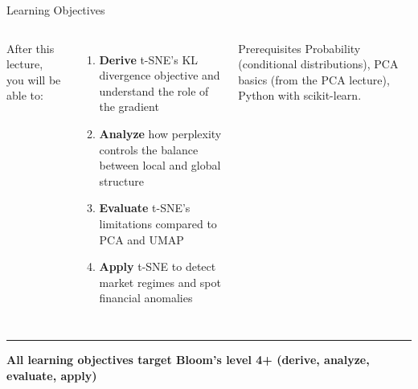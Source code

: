 \documentclass[8pt,aspectratio=169]{beamer}
\newcommand{\bottomnote}[1]{%
\vfill
\vspace{-2mm}
\textcolor{mllavender2}{\rule{\textwidth}{0.4pt}}
\vspace{1mm}
\footnotesize
\textbf{#1}
}
\newcommand{\highlight}[1]{\textcolor{mlorange}{\textbf{#1}}}
\begin{document}
\begin{frame}[t]{Learning Objectives}
\begin{columns}[T]
\small
After this lecture, you will be able to:

\vspace{3mm}
\begin{enumerate}
\setlength{\itemsep}{6pt}
\item \highlight{Derive} t-SNE's KL divergence objective and understand the role of the gradient
\item \highlight{Analyze} how perplexity controls the balance between local and global structure
\item \highlight{Evaluate} t-SNE's limitations compared to PCA and UMAP
\item \highlight{Apply} t-SNE to detect market regimes and spot financial anomalies
\end{enumerate}

\vspace{3mm}
\begin{block}{Prerequisites}
\scriptsize Probability (conditional distributions), PCA basics (from the PCA lecture), Python with scikit-learn.
\end{block}
\end{columns}

\bottomnote{All learning objectives target Bloom's level 4+ (derive, analyze, evaluate, apply)}
\end{frame}
\end{document}
